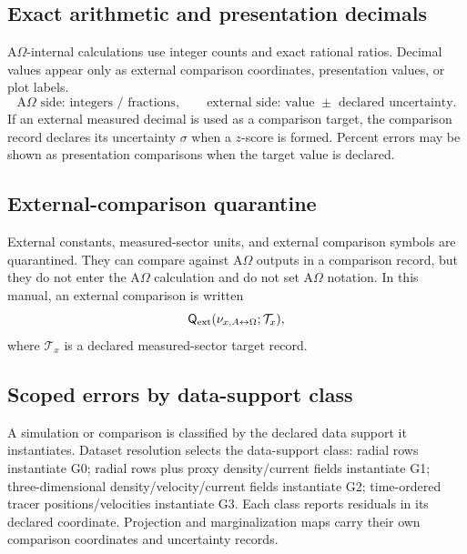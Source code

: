 \subsection{Exact arithmetic and presentation decimals}\label{manual:exact-arithmetic-presentation}
A\(\Omega\)-internal calculations use integer counts and exact rational ratios. Decimal values appear only as external comparison coordinates, presentation values, or plot labels.
\[
\text{A\(\Omega\) side: integers / fractions},
\qquad
\text{external side: value }\pm\text{ declared uncertainty}.
\]
If an external measured decimal is used as a comparison target, the comparison record declares its uncertainty \(\sigma\) when a \(z\)-score is formed. Percent errors may be shown as presentation comparisons when the target value is declared.




\subsection{External-comparison quarantine}\label{manual:external-comparison-quarantine}
External constants, measured-sector units, and external comparison symbols are quarantined. They can compare against A\(\Omega\) outputs in a comparison record, but they do not enter the A\(\Omega\) calculation and do not set A\(\Omega\) notation. In this manual, an external comparison is written
\[
\mathsf{Q}_{\mathrm{ext}}(\nu_{x,A{\leftrightarrow}\Omega};\mathcal T_x),
\]
where \(\mathcal T_x\) is a declared measured-sector target record.


\subsection{Scoped errors by data-support class}\label{manual:scoped-errors-data-support}
A simulation or comparison is classified by the declared data support it instantiates. Dataset resolution selects the data-support class: radial rows instantiate G0; radial rows plus proxy density/current fields instantiate G1; three-dimensional density/velocity/current fields instantiate G2; time-ordered tracer positions/velocities instantiate G3. Each class reports residuals in its declared coordinate. Projection and marginalization maps carry their own comparison coordinates and uncertainty records.

